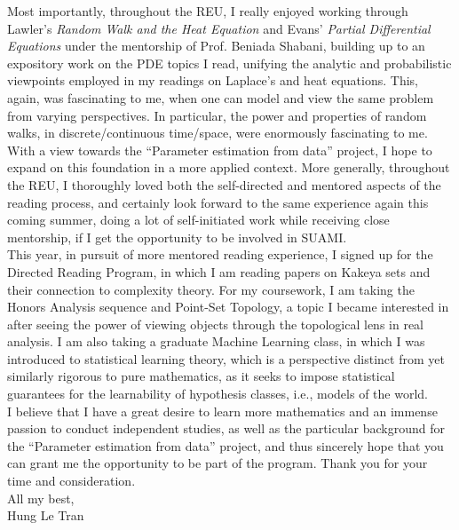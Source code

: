 \documentclass[a4paper, 11pt]{extarticle}
\begin{document}
Most importantly, throughout the REU, I really enjoyed working through Lawler's \textit{Random Walk and the Heat Equation} and Evans' \textit{Partial Differential Equations} under the mentorship of Prof. Beniada Shabani, building up to an expository work on the PDE topics I read, unifying the analytic and probabilistic viewpoints employed in my readings on Laplace's and heat equations. This, again, was fascinating to me, when one can model and view the same problem from varying perspectives. In particular, the power and properties of random walks, in discrete/continuous time/space, were enormously fascinating to me. With a view towards the ``Parameter estimation from data'' project, I hope to expand on this foundation in a more applied context. More generally, throughout the REU, I thoroughly loved both the self-directed and mentored aspects of the reading process, and certainly look forward to the same experience again this coming summer, doing a lot of self-initiated work while receiving close mentorship, if I get the opportunity to be involved in SUAMI.\\

This year, in pursuit of more mentored reading experience, I signed up for the Directed Reading Program, in which I am reading papers on Kakeya sets and their connection to complexity theory. For my coursework, I am taking the Honors Analysis sequence and Point-Set Topology, a topic I became interested in after seeing the power of viewing objects through the topological lens in real analysis. I am also taking a graduate Machine Learning class, in which I was introduced to statistical learning theory, which is a perspective distinct from yet similarly rigorous to pure mathematics, as it seeks to impose statistical guarantees for the learnability of hypothesis classes, i.e., models of the world. \\

I believe that I have a great desire to learn more mathematics and an immense passion to conduct independent studies, as well as the particular background for the ``Parameter estimation from data'' project, and thus sincerely hope that you can grant me the opportunity to be part of the program. Thank you for your time and consideration.\\

All my best,\\

Hung Le Tran
\end{document}
